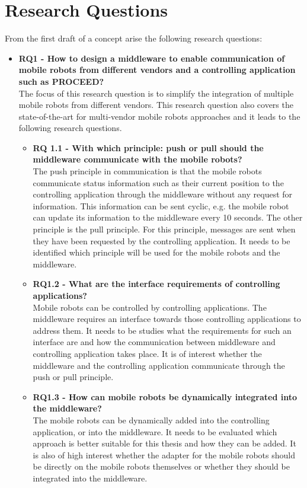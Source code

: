 \section{Research Questions}
From the first draft of a concept arise the following research questions:
\begin{itemize}
   \item \textbf{RQ1 - How to design a middleware to enable communication of mobile robots from different vendors and a controlling application such as PROCEED?} \hfill \\ 
The focus of this research question is to simplify the integration of multiple mobile robots from different vendors. This research question also covers the state-of-the-art for multi-vendor mobile robots approaches and it leads to the following research questions.
\begin{itemize}
     \item \textbf{RQ 1.1 - With which principle: push or pull should the middleware communicate with the mobile robots?} \hfill \\ 
The push principle in communication is that the mobile robots communicate status information such as their current position to the controlling application through the middleware without any request for information. This information can be sent cyclic, e.g. the mobile robot can update its information to the middleware every 10 seconds. The other principle is the pull principle. For this principle, messages are sent when they have been requested by the controlling application. It needs to be identified which principle will be used for the mobile robots and the middleware.
     \item \textbf{RQ1.2 - What are the interface requirements of controlling applications?}  \hfill \\ 
Mobile robots can be controlled by controlling applications. The middleware requires an interface towards those controlling applications to address them. It needs to be studies what the requirements for such an interface are and how the communication between middleware and controlling application takes place. It is of interest whether the middleware and the controlling application communicate through the push or pull principle.
     \item \textbf{RQ1.3 - How can mobile robots be dynamically integrated into the middleware?} \hfill \\ 
The mobile robots can be dynamically added into the controlling application, or into the middleware. It needs to be evaluated which approach is better suitable for this thesis and how they can be added. It is also of high interest whether the adapter for the mobile robots should be directly on the mobile robots themselves or whether they should be integrated into the middleware.

\end{itemize}
\end{itemize}
